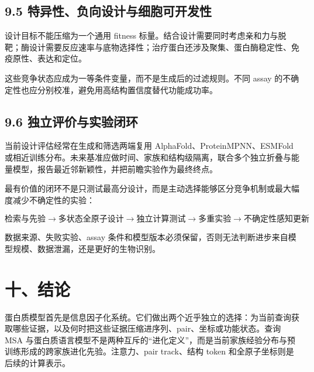 \documentclass[10pt]{article}
\begin{document}
\subsection*{9.5 特异性、负向设计与细胞可开发性}


设计目标不能压缩为一个通用 fitness 标量。结合设计需要同时考虑亲和力与脱靶；酶设计需要反应速率与底物选择性；治疗蛋白还涉及聚集、蛋白酶稳定性、免疫原性、表达和定位。\par

这些竞争状态应成为一等条件变量，而不是生成后的过滤规则。不同 assay 的不确定性也应分别校准，避免用高结构置信度替代功能成功率。\par

\subsection*{9.6 独立评价与实验闭环}


当前设计评估经常在生成和筛选两端复用 AlphaFold、ProteinMPNN、ESMFold 或相近训练分布。未来基准应做时间、家族和结构级隔离，联合多个独立折叠与能量模型，报告最近邻新颖性，并把前瞻实验作为最终终点。\par

最有价值的闭环不是只测试最高分设计，而是主动选择能够区分竞争机制或最大幅度减少不确定性的实验：\par


\begin{equation}
\boxed{
\text{检索与先验}
\to\text{多状态全原子设计}
\to\text{独立计算测试}
\to\text{多重实验}
\to\text{不确定性感知更新}}
\end{equation}

数据来源、失败实验、assay 条件和模型版本必须保留，否则无法判断进步来自模型规模、数据泄漏，还是更好的生物识别。\par

\section*{十、结论}


蛋白质模型首先是信息因子化系统。它们做出两个近乎独立的选择：为当前查询获取哪些证据，以及何时把这些证据压缩进序列、pair、坐标或功能状态。查询 MSA 与蛋白质语言模型不是两种互斥的“进化定义”，而是当前家族经验分布与预训练形成的跨家族进化先验。注意力、pair track、结构 token 和全原子坐标则是后续的计算表示。\par
\end{document}
